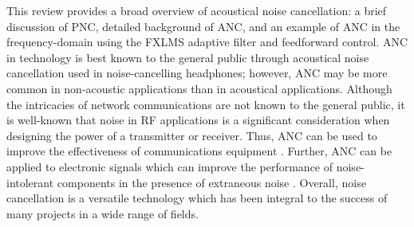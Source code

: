 \documentclass[11pt]{article}
\begin{document}
This review provides a broad overview of acoustical noise cancellation: a brief discussion of PNC, detailed background of ANC, and an example of ANC in the frequency-domain using the FXLMS adaptive filter and feedforward control. ANC in technology is best known to the general public through acoustical noise cancellation used in noise-cancelling headphones; however, ANC may be more common in non-acoustic applications than in acoustical applications. Although the intricacies of network communications are not known to the general public, it is well-known that noise in RF applications is a significant consideration when designing the power of a transmitter or receiver. Thus, ANC can be used to improve the effectiveness of communications equipment \cite{darabi}. Further, ANC can be applied to electronic signals which can improve the performance of noise-intolerant components in the presence of extraneous noise \cite{teoh}. Overall, noise cancellation is a versatile technology which has been integral to the success of many projects in a wide range of fields.

\end{document}
